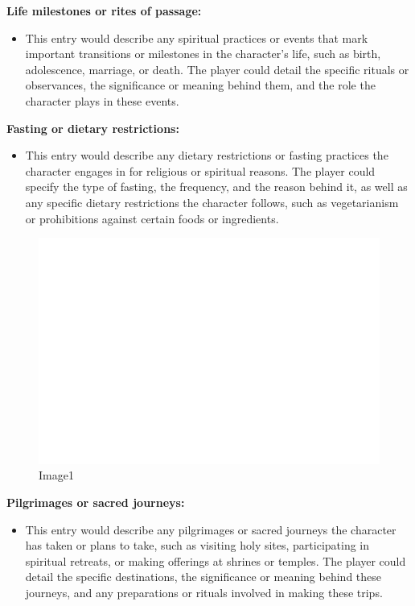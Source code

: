 \textbf{Life milestones or rites of passage:}

\begin{itemize}
\tightlist
\item
  This entry would describe any spiritual practices or events that mark
  important transitions or milestones in the character's life, such as
  birth, adolescence, marriage, or death. The player could detail the
  specific rituals or observances, the significance or meaning behind
  them, and the role the character plays in these events.
\end{itemize}

\textbf{Fasting or dietary restrictions:}

\begin{itemize}
\tightlist
\item
  This entry would describe any dietary restrictions or fasting
  practices the character engages in for religious or spiritual reasons.
  The player could specify the type of fasting, the frequency, and the
  reason behind it, as well as any specific dietary restrictions the
  character follows, such as vegetarianism or prohibitions against
  certain foods or ingredients.
\end{itemize}

\begin{figure}
\centering
\includegraphics{./images/religion07.svg}
\caption{Image1}
\end{figure}

\textbf{Pilgrimages or sacred journeys:}

\begin{itemize}
\tightlist
\item
  This entry would describe any pilgrimages or sacred journeys the
  character has taken or plans to take, such as visiting holy sites,
  participating in spiritual retreats, or making offerings at shrines or
  temples. The player could detail the specific destinations, the
  significance or meaning behind these journeys, and any preparations or
  rituals involved in making these trips.
\end{itemize}


